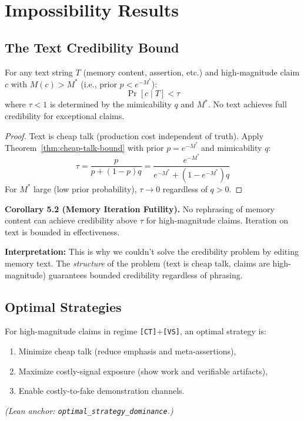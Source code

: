 \section{Impossibility Results}\label{impossibility-results}

\subsection{The Text Credibility
Bound}\label{the-text-credibility-bound}

\begin{theorem}\label{thm:text-bound}
For any text string $T$ (memory content, assertion, etc.) and high-magnitude
claim $c$ with $M(c) > M^*$ (i.e., prior $p < e^{-M^*}$):
\[\Pr[c \mid T] < \tau\]
where $\tau < 1$ is determined by the mimicability $q$ and $M^*$.
No text achieves full credibility for exceptional claims.

  
\end{theorem}

\begin{proof}
Text is cheap talk (production cost independent of truth). Apply
Theorem~\ref{thm:cheap-talk-bound} with prior $p = e^{-M^*}$ and mimicability $q$:
\[
\tau = \frac{p}{p + (1-p)q} = \frac{e^{-M^*}}{e^{-M^*} + (1 - e^{-M^*})q}
\]
For $M^*$ large (low prior probability), $\tau \to 0$ regardless of $q > 0$.
\end{proof}

\textbf{Corollary 5.2 (Memory Iteration Futility).} No rephrasing of
memory content can achieve credibility above \(\tau\) for high-magnitude
claims. Iteration on text is bounded in effectiveness.

\textbf{Interpretation:} This is why we couldn't solve the credibility
problem by editing memory text. The \emph{structure} of the problem
(text is cheap talk, claims are high-magnitude) guarantees bounded
credibility regardless of phrasing.

\subsection{Optimal Strategies}\label{optimal-strategies}

\begin{theorem}\label{thm:optimal-credibility-strategy}
For high-magnitude claims in regime \texttt{[CT]}+\texttt{[VS]}, an optimal strategy is:
\begin{enumerate}
\item Minimize cheap talk (reduce emphasis and meta-assertions),
\item Maximize costly-signal exposure (show work and verifiable artifacts),
\item Enable costly-to-fake demonstration channels.
\end{enumerate}
\textit{(Lean anchor: \texttt{optimal\_strategy\_dominance}.)}
\end{theorem}

